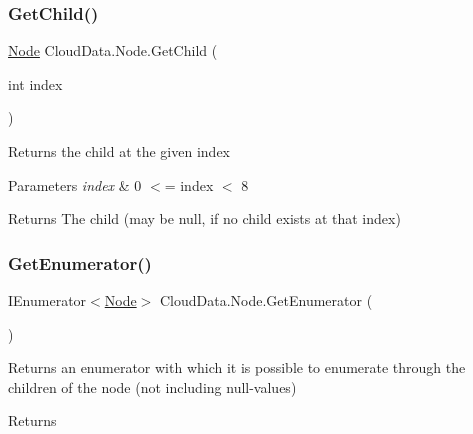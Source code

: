 \mbox{\label{class_cloud_data_1_1_node_a93ba39401d22c904ec3a9631fca1c222}} 
\subsubsection{\texorpdfstring{Get\+Child()}{GetChild()}}
{\footnotesize\ttfamily \hyperlink{class_cloud_data_1_1_node}{Node} Cloud\+Data.\+Node.\+Get\+Child (\begin{DoxyParamCaption}\item[{int}]{index }\end{DoxyParamCaption})\hspace{0.3cm}{\ttfamily [inline]}}



Returns the child at the given index 


\begin{DoxyParams}{Parameters}
{\em index} & 0 $<$= index $<$ 8\\
\hline
\end{DoxyParams}
\begin{DoxyReturn}{Returns}
The child (may be null, if no child exists at that index)
\end{DoxyReturn}
\mbox{\label{class_cloud_data_1_1_node_adbc0168d2d1b1c9600c2f91720f00c18}} 
\subsubsection{\texorpdfstring{Get\+Enumerator()}{GetEnumerator()}}
{\footnotesize\ttfamily I\+Enumerator$<$\hyperlink{class_cloud_data_1_1_node}{Node}$>$ Cloud\+Data.\+Node.\+Get\+Enumerator (\begin{DoxyParamCaption}{ }\end{DoxyParamCaption})\hspace{0.3cm}{\ttfamily [inline]}}



Returns an enumerator with which it is possible to enumerate through the children of the node (not including null-\/values) 

\begin{DoxyReturn}{Returns}

\end{DoxyReturn}
\mbox{\label{class_cloud_data_1_1_node_af70f14b2486f62d63e1155a1a7d4f34f}} 
